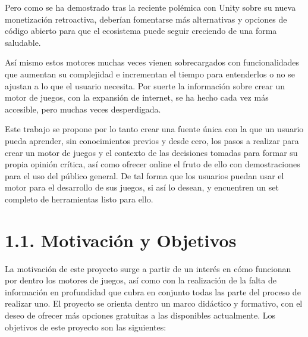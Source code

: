 Pero como se ha demostrado tras la reciente polémica con Unity sobre su nueva monetización retroactiva\cite{unity-polemic},
deberían fomentarse más alternativas y opciones de código abierto para que el ecosistema puede seguir creciendo de una forma
saludable.

Así mismo estos motores muchas veces vienen sobrecargados con funcionalidades que aumentan su complejidad e incrementan
el tiempo para entenderlos o no se ajustan a lo que el usuario necesita. Por suerte la información sobre crear un motor de juegos,
con la expansión de internet, se ha hecho cada vez más accesible, pero muchas veces desperdigada.

Este trabajo se propone por lo tanto crear una fuente única con la que un usuario pueda aprender, sin conocimientos previos
y desde cero, los pasos a realizar para crear un motor de juegos y el contexto de las decisiones tomadas para formar su
propia opinión crítica, así como ofrecer online el fruto de ello con demostraciones para el uso del público general.
De tal forma que los usuarios puedan usar el motor para el desarrollo de sus juegos, si
así lo desean, y encuentren un set completo de herramientas listo para ello.

\newpage

\section*{1.1. Motivación y Objetivos}\label{sec:motivation}

La motivación de este proyecto surge a partir de un interés en cómo funcionan por dentro los motores de juegos,
así como con la realización de la falta de información en profundidad que cubra en conjunto todas las parte del proceso
de realizar uno. El proyecto se orienta dentro un marco didáctico y formativo, con el deseo de ofrecer más opciones
gratuitas a las disponibles actualmente. Los objetivos de este proyecto son las siguientes:

